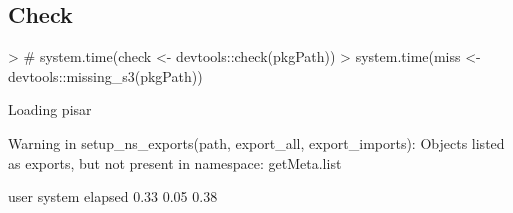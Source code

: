 \documentclass[a4paper,12pt]{article}\usepackage[]{graphicx}\usepackage[]{color}
\begin{document}
\subsection{Check}
\begin{Schunk}
\begin{Sinput}
> # system.time(check <- devtools::check(pkgPath))
> system.time(miss <- devtools::missing_s3(pkgPath))
\end{Sinput}
\begin{Soutput}
Loading pisar
\end{Soutput}
\begin{Soutput}
Warning in setup_ns_exports(path, export_all, export_imports): Objects listed as exports, but not present in namespace: getMeta.list
\end{Soutput}
\begin{Soutput}
   user  system elapsed 
   0.33    0.05    0.38 
\end{Soutput}
\end{Schunk}
\clearpage
\end{document}
